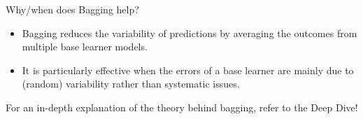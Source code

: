 \documentclass[11pt,compress,t,notes=noshow, xcolor=table]{beamer}
\begin{document}
\begin{vbframe}{Why/when does Bagging help?}

\begin{itemize}
  \item Bagging reduces the variability of predictions by averaging the outcomes from multiple base learner models.

  \item It is particularly effective when the errors of a base learner are mainly due to (random) variability rather than systematic issues.
\end{itemize}

For an in-depth explanation of the theory behind bagging, refer to the Deep Dive!







\end{vbframe}
\end{document}
